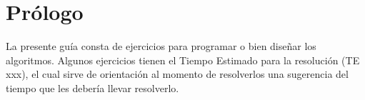 \chapter{Prólogo}
La presente guía consta de ejercicios para programar o bien diseñar los algoritmos.
Algunos ejercicios tienen el Tiempo Estimado para la resolución (TE xxx), el cual sirve de orientación al momento de resolverlos una sugerencia del tiempo que les debería llevar resolverlo.

